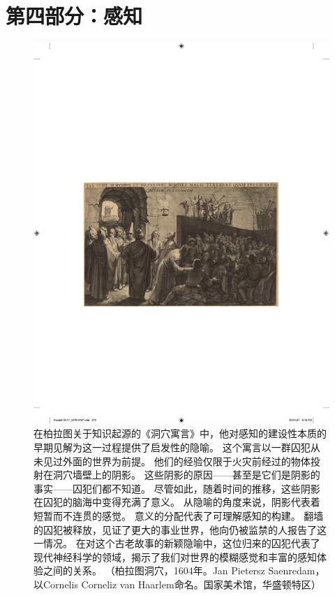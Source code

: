 \chapter*{第四部分：感知}

\begin{figure}[htbp]
	\centering
	\includegraphics[width=1.0\linewidth]{chap17/fig_17_0}
	\caption{在柏拉图关于知识起源的《洞穴寓言》中，他对感知的建设性本质的早期见解为这一过程提供了启发性的隐喻。
		这个寓言以一群囚犯从未见过外面的世界为前提。
		他们的经验仅限于火灾前经过的物体投射在洞穴墙壁上的阴影。
		这些阴影的原因——甚至是它们是阴影的事实——囚犯们都不知道。
		尽管如此，随着时间的推移，这些阴影在囚犯的脑海中变得充满了意义。
		从隐喻的角度来说，阴影代表着短暂而不连贯的感觉。
		意义的分配代表了可理解感知的构建。
		翻墙的囚犯被释放，见证了更大的事业世界，他向仍被监禁的人报告了这一情况。
		在对这个古老故事的新颖隐喻中，这位归来的囚犯代表了现代神经科学的领域，揭示了我们对世界的模糊感觉和丰富的感知体验之间的关系。
		（柏拉图洞穴，1604年。Jan Pietersz Saenredam，以Cornelis Corneliz van Haarlem命名。国家美术馆，华盛顿特区）}
	\label{fig:17_0}
\end{figure}

